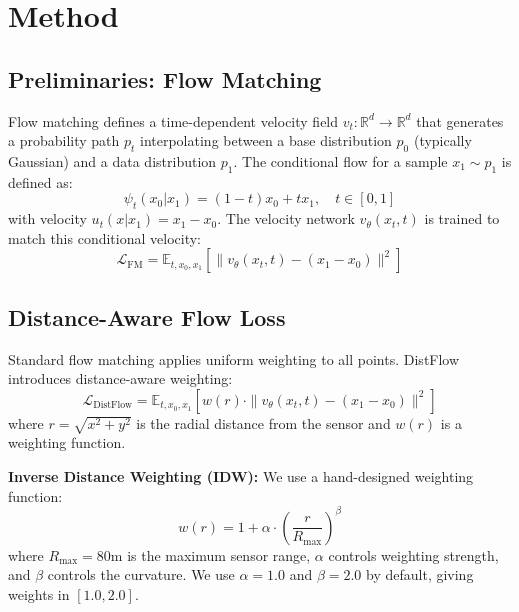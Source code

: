 \documentclass{article}
\begin{document}
\section{Method}

\subsection{Preliminaries: Flow Matching}

Flow matching \citep{lipman2023flow} defines a time-dependent velocity field $v_t: \mathbb{R}^d \rightarrow \mathbb{R}^d$ that generates a probability path $p_t$ interpolating between a base distribution $p_0$ (typically Gaussian) and a data distribution $p_1$. The conditional flow for a sample $x_1 \sim p_1$ is defined as:
\begin{equation}
    \psi_t(x_0 | x_1) = (1 - t) x_0 + t x_1, \quad t \in [0, 1]
\end{equation}
with velocity $u_t(x | x_1) = x_1 - x_0$. The velocity network $v_\theta(x_t, t)$ is trained to match this conditional velocity:
\begin{equation}
    \mathcal{L}_{\text{FM}} = \mathbb{E}_{t, x_0, x_1} \left[ \|v_\theta(x_t, t) - (x_1 - x_0)\|^2 \right]
\end{equation}

\subsection{Distance-Aware Flow Loss}

Standard flow matching applies uniform weighting to all points. DistFlow introduces distance-aware weighting:
\begin{equation}
    \mathcal{L}_{\text{DistFlow}} = \mathbb{E}_{t, x_0, x_1} \left[ w(r) \cdot \|v_\theta(x_t, t) - (x_1 - x_0)\|^2 \right]
\end{equation}
where $r = \sqrt{x^2 + y^2}$ is the radial distance from the sensor and $w(r)$ is a weighting function.

\textbf{Inverse Distance Weighting (IDW):} We use a hand-designed weighting function:
\begin{equation}
    w(r) = 1 + \alpha \cdot \left(\frac{r}{R_{\max}}\right)^\beta
\end{equation}
where $R_{\max} = 80\text{m}$ is the maximum sensor range, $\alpha$ controls weighting strength, and $\beta$ controls the curvature. We use $\alpha=1.0$ and $\beta=2.0$ by default, giving weights in $[1.0, 2.0]$.
\end{document}
